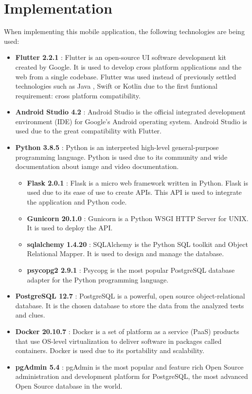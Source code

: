 \section{Implementation}
\label{implementation}

When implementing this mobile application, the following technologies are being used:

\begin{itemize}
  \item \textbf{Flutter 2.2.1} \cite{Flutter}: Flutter is an open-source UI software development kit created by Google. It is used to develop cross platform applications and the web from a single codebase. Flutter was used instead of previously settled technologies such as Java \cite{Java}, Swift \cite{Swift} or Kotlin \cite{Kotlin} due to the first funtional requirement: cross platform compatibility.
  \item \textbf{Android Studio 4.2} \cite{AndroidStudio}: Android Studio is the official integrated development environment (IDE) for Google's Android \cite{Android} operating system. Android Studio is used due to the great compatibility with Flutter.
  \item \textbf{Python 3.8.5} \cite{Python}: Python is an interpreted high-level general-purpose programming language. Python is used due to its community and wide documentation about iamge and video documentation.
  \begin{itemize}
    \item \textbf{Flask 2.0.1} \cite{Flask}: Flask is a micro web framework written in Python. Flask is used due to its ease of use to create APIs. This API is used to integrate the application and Python code.
    \item \textbf{Gunicorn 20.1.0} \cite{Gunicorn}: Gunicorn is a Python WSGI HTTP Server for UNIX. It is used to deploy the API.
    \item \textbf{sqlalchemy 1.4.20} \cite{sqlalchemy}: SQLAlchemy is the Python SQL toolkit and Object Relational Mapper. It is used to design and manage the database.
    \item \textbf{psycopg2 2.9.1} \cite{psycopg2}: Psycopg is the most popular PostgreSQL database adapter for the Python programming language.
  \end{itemize}
  \item \textbf{PostgreSQL 12.7} \cite{postgres}: PostgreSQL is a powerful, open source object-relational database. It is the chosen database to store the data from the analyzed tests and clues.
  \item \textbf{Docker 20.10.7} \cite{Docker}: Docker is a set of platform as a service (PaaS) products that use OS-level virtualization to deliver software in packages called containers. Docker is used due to its portability and scalability.
  \item \textbf{pgAdmin 5.4} \cite{pgAdmin}: pgAdmin is the most popular and feature rich Open Source administration and development platform for PostgreSQL, the most advanced Open Source database in the world.
\end{itemize}


